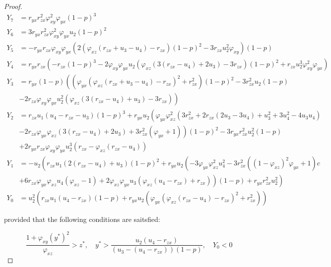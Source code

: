 \begin{proof}
    \begin{align*}
        Y_7 &= r_{yx}r_{zx}^2\varphi_{xy}^2\varphi_{yx}\left(1-p\right)^3\\
        Y_6 &= 3r_{yx}r_{zx}^2\varphi_{xy}^2\varphi_{yx}u_2\left(1-p\right)^2\\
        Y_5 &= -r_{yx}r_{zx}\varphi_{xy}\varphi_{yx}\left(2\left(\varphi_{xz}\left(r_{zx}+u_3-u_4\right)-r_{zx}\right)\left(1-p\right)^2-3r_{zx}u_2^2\varphi_{xy}\right)\left(1-p\right)\\
        Y_4 &= r_{yx}r_{zx}\left(-r_{zx}\left(1-p\right)^3-2\varphi_{xy}\varphi_{yx}u_2\left(\varphi_{xz}\left(3\left(r_{zx}-u_4\right)+2u_3\right)-3r_{zx}\right)\left(1-p\right)^2+r_{zx}u_2^3\varphi_{xy}^2\varphi_{yx}\right)\\
        Y_3 &= r_{yx}\left(1-p\right)\left(\left(\varphi_{yx}\left(\varphi_{xz}\left(r_{zx}+u_3-u_4\right)-r_{zx}\right)^2+r_{zx}^2\right)\left(1-p\right)^2-3r_{zx}^2u_2\left(1-p\right)\right.\\
        &\left.-2r_{zx}\varphi_{xy}\varphi_{yx}u_2^2\left(\varphi_{xz}\left(3\left(r_{zx}-u_4\right)+u_3\right)-3r_{zx}\right)\right)\\
        Y_2 &= r_{zx}u_1\left(u_4-r_{zx}-u_3\right)\left(1-p\right)^3+r_{yx}u_2\left(\varphi_{yx}\varphi_{xz}^2\left(3r_{zx}^2+2r_{zx}\left(2u_3-3u_4\right)+u_3^2+3u_4^2-4u_3u_4\right)\right.\\
        &\left.-2r_{zx}\varphi_{yx}\varphi_{xz}\left(3\left(r_{zx}-u_4\right)+2u_3\right)+3r_{zx}^2\left(\varphi_{yx}+1\right)\right)\left(1-p\right)^2-3r_{yx}r_{zx}^2u_2^2\left(1-p\right)\\
        &+2r_{yx}r_{zx}\varphi_{xy}\varphi_{yx}u_2^3\left(r_{zx}-\varphi_{xz}\left(r_{zx}-u_4\right)\right)\\
        Y_1 &= -u_2\left(r_{zx}u_1\left(2\left(r_{zx}-u_4\right)+u_3\right)\left(1-p\right)^2+r_{yx}u_2\left(-3\varphi_{yx}\varphi_{xz}^2u_4^2-3r_{zx}^2\left(\left(1-\varphi_{xz}\right)^2\varphi_{yx}+1\right)\right.c \right.\\
        &\left.\left.+6r_{zx}\varphi_{yx}\varphi_{xz}u_4\left(\varphi_{xz}-1\right)+2\varphi_{xz}\varphi_{yx}u_3\left(\varphi_{xz}\left(u_4-r_{zx}\right)+r_{zx}\right)\right)\left(1-p\right)+r_{yx}r_{zx}^2u_2^2 \right)\\
        Y_0 &= u_2^2\left(r_{zx}u_1\left(u_4-r_{zx}\right)\left(1-p\right)+r_{yx}u_2\left(\varphi_{yx}\left(\varphi_{xz}\left(r_{zx}-u_4\right)-r_{zx}\right)^2+r_{zx}^2\right)\right)
    \end{align*}

    provided that the following conditions are saitsfied:
    
    \begin{equation*}
        \frac{1+\varphi_{xy}\left(y^*\right)^2}{\varphi_{xz}}>z^*,\quad
        y^*>\frac{u_2\left(u_4-r_{zx}\right)}{\left(u_3-\left(u_4-r_{zx}\right)\right)\left(1-p\right)},\quad
        Y_0 < 0
    \end{equation*}
\end{proof}


